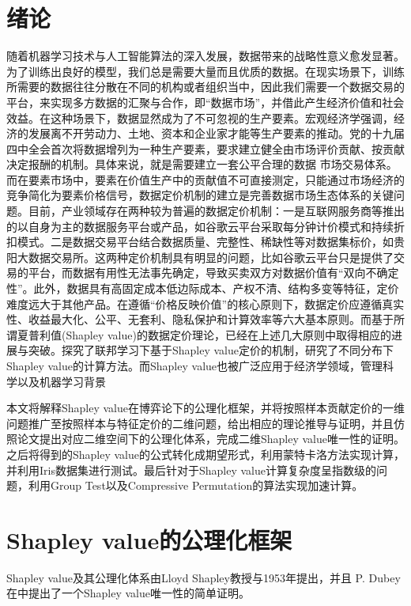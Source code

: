 \section{绪论}
随着机器学习技术与人工智能算法的深入发展，数据带来的战略性意义愈发显著。为了训练出良好的模型，我们总是需要大量而且优质的数据。在现实场景下，训练所需要的数据往往分散在不同的机构或者组织当中，因此我们需要一个数据交易的平台，来实现多方数据的汇聚与合作，即“数据市场”，并借此产生经济价值和社会效益。在这种场景下，数据显然成为了不可忽视的生产要素。宏观经济学强调，经济的发展离不开劳动力、土地、资本和企业家才能等生产要素的推动\cite[66]{赵英军2004西方经济学}。党的十九届四中全会首次将数据增列为一种生产要素，要求建立健全由市场评价贡献、按贡献决定报酬的机制。具体来说，就是需要建立一套公平合理的数据
市场交易体系。而在要素市场中，要素在价值生产中的贡献值不可直接测定，只能通过市场经济的竞争简化为要素价格信号，数据定价机制的建立是完善数据市场生态体系的关键问题。目前，产业领域存在两种较为普遍的数据定价机制：一是互联网服务商等推出的以自身为主的数据服务平台或产品，如谷歌云平台采取每分钟计价模式和持续折扣模式。二是数据交易平台结合数据质量、完整性、稀缺性等对数据集标价，如贵阳大数据交易所。这两种定价机制具有明显的问题，比如谷歌云平台只是提供了交易的平台，而数据有用性无法事先确定，导致买卖双方对数据价值有“双向不确定性”。此外，数据具有高固定成本低边际成本、产权不清、结构多变等特征，定价难度远大于其他产品。在遵循“价格反映价值”的核心原则下，数据定价应遵循真实性、收益最大化、公平、无套利、隐私保护和计算效率等六大基本原则。而基于所谓夏普利值(Shapley value)的数据定价理论，已经在上述几大原则中取得相应的进展与突破。\cite{wang2020principled}探究了联邦学习下基于Shapley value定价的机制，\cite{kwon2021efficient}研究了不同分布下Shapley value的计算方法。而Shapley value也被广泛应用于经济学领域\cite{gul1989bargaining}，管理科学\cite{dubey1982shapley}以及机器学习背景\cite{zaeri2018feature}\cite{cohen2005feature}

本文将解释Shapley value在博弈论下的公理化框架，并将按照样本贡献定价的一维问题推广至按照样本与特征定价的二维问题，给出相应的理论推导与证明，并且仿照论文\cite{strumbelj2010efficient}提出对应二维空间下的公理化体系，完成二维Shapley value唯一性的证明。之后将得到的Shapley value的公式转化成期望形式，利用蒙特卡洛方法实现计算，并利用Iris数据集进行测试。最后针对于Shapley value计算复杂度呈指数级的问题，利用Group Test以及Compressive Permutation的算法实现加速计算。

\section{Shapley value的公理化框架}
Shapley value及其公理化体系由Lloyd Shapley教授与1953年提出，并且 P. Dubey在\cite{dubey1975uniqueness}中提出了一个Shapley value唯一性的简单证明。
